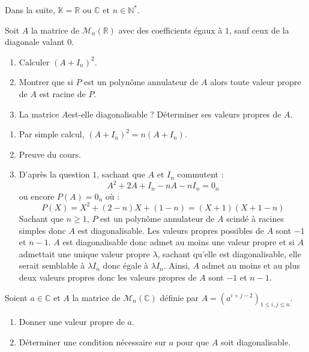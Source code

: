 \documentclass[a4paper,10pt]{report}
\begin{document}
\everymath{\displaystyle}


\begin{center}
\end{center}

\bigskip

\noindent Dans la suite, $\mathbb{K} = \mathbb{R}$ ou $\mathbb{C}$ et $n \in \mathbb{N}^*$.

\medskip

\begin{Exa} Soit $A$ la matrice de $\mathcal{M}_n(\mathbb{R})$ avec des coefficients égaux à $1$, sauf ceux de la diagonale valant $0$.

\begin{enumerate}
\item Calculer $(A+I_n)^2$.
\item Montrer que si $P$ est un polynôme annulateur de $A$ alors toute valeur propre de $A$ est racine de $P$.
\item La matrice $A$est-elle diagonalisable ? Déterminer ses valeurs propres de $A$. 
\end{enumerate}
\end{Exa}

\corr 
\begin{enumerate}
\item Par simple calcul, $(A+I_n)^2 = n (A+I_n)$.
\item Preuve du cours.
\item D'après la question $1$, sachant que $A$ et $I_n$ commutent :
$$ A^2 +2A+I_n -nA-nI_n=0_n$$
ou encore $P(A)=0_n$ où :
$$ P(X)=X^2+(2-n)X+(1-n) = (X+1)(X+1-n)$$
Sachant que $n \geq 1$, $P$ est un polynôme annulateur de $A$ scindé à racines simples donc $A$ est diagonalisable. Les valeurs propres possibles de $A$ sont $-1$ et $n-1$. $A$ est diagonalisable donc admet au moins une valeur propre et si $A$ admettait une unique valeur propre $\lambda$, sachant qu'elle est diagonalisable, elle serait semblable à $\lambda I_n$ donc égale à $\lambda I_n$. Ainsi, $A$ admet au moins et au plus deux valeurs propres donc les valeurs propres de $A$ sont $-1$ et $n-1$.
\end{enumerate}

\begin{Exa} Soient $a \in \mathbb{C}$ et $A$ la matrice de $\mathcal{M}_n(\mathbb{C})$ définie par $A=( a^{i+j-2})_{1 \leq i,j \leq n}$.

\begin{enumerate}
\item Donner une valeur propre de $a$.
\item Déterminer une condition nécessaire sur $a$ pour que $A$ soit diagonalisable.
\end{enumerate}
\end{Exa}
\end{document}
